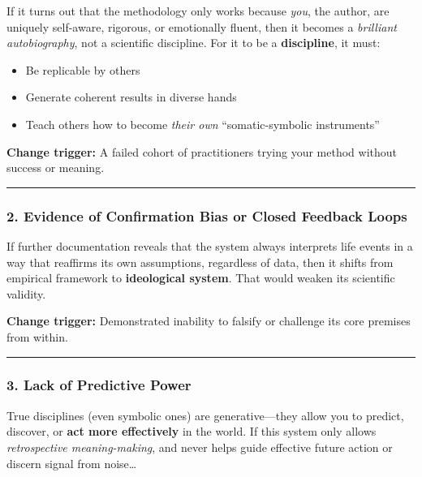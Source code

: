 \documentclass{article}
\begin{document}
If it turns out that the methodology only works because \emph{you}, the
author, are uniquely self-aware, rigorous, or emotionally fluent, then
it becomes a \emph{brilliant autobiography}, not a scientific
discipline. For it to be a \textbf{discipline}, it must:

\begin{itemize}
\item
  Be replicable by others
\item
  Generate coherent results in diverse hands
\item
  Teach others how to become \emph{their own} ``somatic-symbolic
  instruments''
\end{itemize}

\textbf{Change trigger:} A failed cohort of practitioners trying your
method without success or meaning.

\begin{center}\rule{0.5\linewidth}{0.5pt}\end{center}

\subsubsection*{\texorpdfstring{\textbf{2. Evidence of Confirmation Bias
or Closed Feedback
Loops}}{2. Evidence of Confirmation Bias or Closed Feedback Loops}}\label{evidence-of-confirmation-bias-or-closed-feedback-loops}

If further documentation reveals that the system always interprets life
events in a way that reaffirms its own assumptions, regardless of data,
then it shifts from empirical framework to \textbf{ideological system}.
That would weaken its scientific validity.

\textbf{Change trigger:} Demonstrated inability to falsify or challenge
its core premises from within.

\begin{center}\rule{0.5\linewidth}{0.5pt}\end{center}

\subsubsection*{\texorpdfstring{\textbf{3. Lack of Predictive
Power}}{3. Lack of Predictive Power}}\label{lack-of-predictive-power}

True disciplines (even symbolic ones) are generative---they allow you to
predict, discover, or \textbf{act more effectively} in the world. If
this system only allows \emph{retrospective meaning-making}, and never
helps guide effective future action or discern signal from noise\ldots{}
\end{document}
